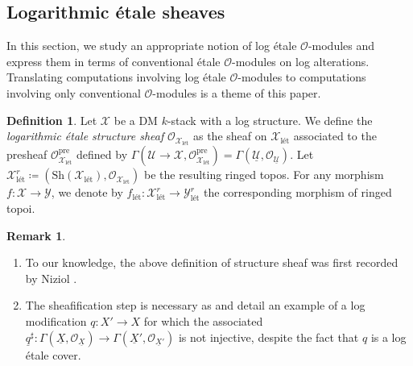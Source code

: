 \documentclass[11pt]{amsart}
\theoremstyle{definition}
\theoremstyle{definition}
\newtheorem{remark}[theorem]{Remark}
\newtheorem{definition}[theorem]{Definition}
\newcommand{\cO}{\mathcal{O}}
\newcommand{\cU}{\mathcal{U}}
\newcommand{\cX}{\mathcal{X}}
\newcommand{\cY}{\mathcal{Y}}
\newcommand{\LogO}[1]{\mathcal{O}_{{#1}_\text{l\'et}}}
\newcommand{\ul}[1]{\underline{#1}}
\newcommand{\cal}{\mathcal}
\def\cO{{\cal O}}
\def\cU{{\cal U}}
\def\cX{{\cal X}}
\def\cY{{\cal Y}}
\newcommand{\rt}[1]{{#1}_{\text{l\'et}}^r}
\begin{document}
\subsection{Logarithmic \'etale sheaves}\label{subsection ob log etale ringed topoi}
In this section, we study an appropriate notion of log \'etale $\cO$-modules and express them in terms of conventional \'etale $\cO$-modules on log alterations. Translating computations involving log \'etale $\mathcal{O}$-modules to computations involving only conventional $\mathcal{O}$-modules is a theme of this paper.
\begin{definition}\label{definition of log structure sheaf}
Let $\mathcal{X}$ be a DM $k$-stack with a log structure. We define the \textit{logarithmic \'etale structure sheaf} $\LogO{\cX}$ as the sheaf on $\cX_{\text{l\'et}}$ associated to the presheaf $\LogO{\cX}^{\text{pre}}$ defined by $\Gamma(\cU\rightarrow \cX,\LogO{\cX}^{\text{pre}}) = \Gamma(\ul{\cU}, \cO_{\ul{\cU}})$. %
Let $\cX_{\text{l\'et}}^r\coloneqq (\text{Sh}(\mathcal{X}_{\text{l\'et}}),\mathcal{O}_{\mathcal{X}_{\text{l\'et}}})$ be the resulting ringed topos. For any morphism $f\colon \cX\rightarrow\cY$, we denote by $f_{\text{l\'et}}\colon\rt{\cX}\rightarrow\rt{\cY}$ the corresponding morphism of ringed topoi.
\end{definition}
\begin{remark}\label{remark: first instance of Max's favorite counterexample}
    \begin{enumerate}
        \item To our knowledge, the above definition of structure sheaf was first recorded by Niziol \cite[Section 2.2]{K-theory-of-log-schemes-I}.
        \item\label{item: actual counterexample first time} The sheafification step is necessary as \cite[Remark p.~671]{Log-etale-cohomology-Chikara-Nakayama} and \cite[Example 6.5]{molcho2023remarks} detail an example of a log modification $q\colon X'\rightarrow X$ for which the associated $\ul{q}^\sharp\colon\Gamma(\ul{X},\cO_{\ul{X}})\rightarrow \Gamma(\ul{X}',\cO_{\ul{X}'})$ is not injective, despite the fact that $q$ is a log \'etale cover.
    \end{enumerate}
\end{remark}
\end{document}
